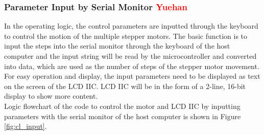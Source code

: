 \subsubsection{Parameter Input by Serial Monitor \textcolor{red}{Yuehan}}
In the operating logic, the control parameters are inputted through the keyboard to control the motion of the 
multiple stepper motors. The basic function is to input the steps into the serial monitor through the keyboard 
of the host computer and the input string will be read by the microcontroller and converted into data, which are 
used as the number of steps of the stepper motor movement. For easy operation and display, the input parameters 
need to be displayed as text on the screen of the LCD IIC. LCD IIC will be in the form of a 2-line, 16-bit display 
to show more content. \\
Logic flowchart of the code to control the motor and LCD IIC by inputting parameters with the serial monitor of 
the host computer is shown in Figure \ref{fig:cl_input}.

